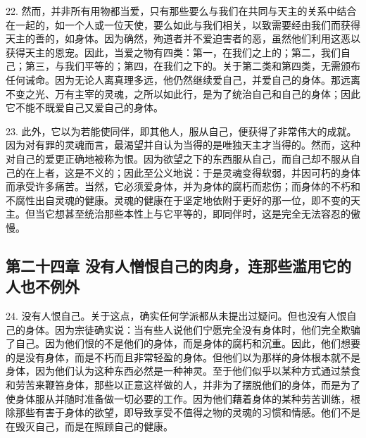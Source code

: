 22. 然而，并非所有用物都当爱，只有那些要么与我们在共同与天主的关系中结合在一起的，如一个人或一位天使，要么如此与我们相关，以致需要经由我们而获得天主的善的，如身体。因为确然，殉道者并不爱迫害者的恶，虽然他们利用这恶以获得天主的恩宠。因此，当爱之物有四类：第一，在我们之上的；第二，我们自己；第三，与我们平等的；第四，在我们之下的。关于第二类和第四类，无需颁布任何诫命。因为无论人离真理多远，他仍然继续爱自己，并爱自己的身体。那远离不变之光、万有主宰的灵魂，之所以如此行，是为了统治自己和自己的身体；因此它不能不既爱自己又爱自己的身体。\par

23. 此外，它以为若能使同伴，即其他人，服从自己，便获得了非常伟大的成就。因为对有罪的灵魂而言，最渴望并自认为当得的是唯独天主才当得的。然而，这种对自己的爱更正确地被称为恨。因为欲望之下的东西服从自己，而自己却不服从自己的在上者，这是不义的；因此至公义地说：于是灵魂变得软弱，并因可朽的身体而承受许多痛苦。当然，它必须爱身体，并为身体的腐朽而悲伤；而身体的不朽和不腐性出自灵魂的健康。灵魂的健康在于坚定地依附于更好的那一位，即不变的天主。但当它想甚至统治那些本性上与它平等的，即同伴时，这是完全无法容忍的傲慢。\par


\subsection{第二十四章 没有人憎恨自己的肉身，连那些滥用它的人也不例外}

24. 没有人恨自己。关于这点，确实任何学派都从未提出过疑问。但也没有人恨自己的身体。因为宗徒确实说：当有些人说他们宁愿完全没有身体时，他们完全欺骗了自己。因为他们恨的不是他们的身体，而是身体的腐朽和沉重。因此，他们想要的是没有身体，而是不朽而且非常轻盈的身体。但他们以为那样的身体根本就不是身体，因为他们认为这种东西必然是一种神灵。至于他们似乎以某种方式通过禁食和劳苦来鞭笞身体，那些以正意这样做的人，并非为了摆脱他们的身体，而是为了使身体服从并随时准备做一切必要的工作。因为他们藉着身体的某种劳苦训练，根除那些有害于身体的欲望，即导致享受不值得之物的灵魂的习惯和情感。他们不是在毁灭自己，而是在照顾自己的健康。\par

